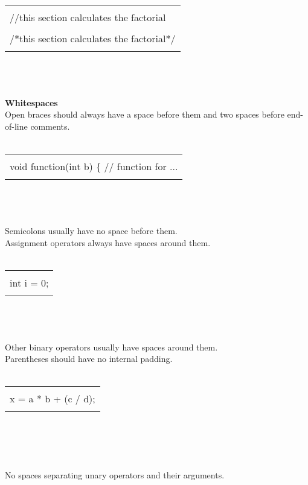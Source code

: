 \documentclass{article}
\begin{document}
\begin{tabular}{|p{}|}
\hline\\
//this section calculates the factorial\\ \\
/*this section calculates the factorial*/\\ \\
\hline 
\end{tabular}\\ \\ \\
\textbf{\large{Whitespaces}}\\
Open braces should always have a space before them and two spaces before end-of-line comments. \\ \\

\begin{tabular}{|p{}|}
\hline\\
void function(int b) \{  // function for ...\\\\
\hline 
\end{tabular}\\ \\ \\
Semicolons usually have no space before them.\\
Assignment operators always have spaces around them.\\ \\

\begin{tabular}{|p{}|}
\hline\\
int i = 0;\\\\
\hline 
\end{tabular}\\ \\ \\
Other binary operators usually have spaces around them.\\
Parentheses should have no internal padding.\\ \\

\begin{tabular}{|p{}|}
\hline\\
x = a * b + (c / d);\\\\
\hline 
\end{tabular}\\ \\ \\ \\
No spaces separating unary operators and their arguments.\\ \\
\end{document}
